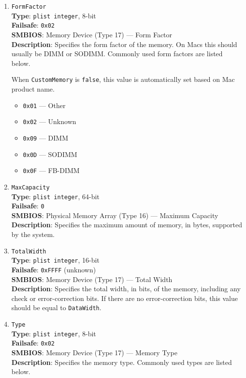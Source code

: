 \documentclass[]{article}
\providecommand{\tightlist}{%
  \setlength{\itemsep}{0pt}\setlength{\parskip}{0pt}}
\begin{document}
\begin{enumerate}
\item
  \texttt{FormFactor}\\
  \textbf{Type}: \texttt{plist\ integer}, 8-bit\\
  \textbf{Failsafe}: \texttt{0x02}\\
  \textbf{SMBIOS}: Memory Device (Type 17) --- Form Factor\\
  \textbf{Description}: Specifies the form factor of the memory.
  On Macs this should usually be DIMM or SODIMM. Commonly used form
  factors are listed below.

  When \texttt{CustomMemory} is \texttt{false}, this value is automatically set
  based on Mac product name.

  \begin{itemize}
  \tightlist
  \item
    \texttt{0x01} --- Other
  \item
    \texttt{0x02} --- Unknown
  \item
    \texttt{0x09} --- DIMM
  \item
    \texttt{0x0D} --- SODIMM
  \item
    \texttt{0x0F} --- FB-DIMM
  \end{itemize}

\item
  \texttt{MaxCapacity}\\
  \textbf{Type}: \texttt{plist\ integer}, 64-bit\\
  \textbf{Failsafe}: \texttt{0}\\
  \textbf{SMBIOS}: Physical Memory Array (Type 16) --- Maximum Capacity\\
  \textbf{Description}: Specifies the maximum amount of memory, in bytes,
  supported by the system.

\item
  \texttt{TotalWidth}\\
  \textbf{Type}: \texttt{plist\ integer}, 16-bit\\
  \textbf{Failsafe}: \texttt{0xFFFF} (unknown)\\
  \textbf{SMBIOS}: Memory Device (Type 17) --- Total Width\\
  \textbf{Description}: Specifies the total width, in bits, of the
  memory, including any check or error-correction bits. If there are
  no error-correction bits, this value should be equal to \texttt{DataWidth}.

\item
  \texttt{Type}\\
  \textbf{Type}: \texttt{plist\ integer}, 8-bit\\
  \textbf{Failsafe}: \texttt{0x02}\\
  \textbf{SMBIOS}: Memory Device (Type 17) --- Memory Type\\
  \textbf{Description}: Specifies the memory type. Commonly used types are listed below.


\end{enumerate}
\end{document}
